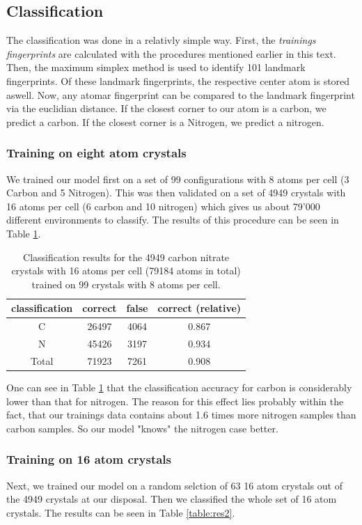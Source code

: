 \newpage
\subsection{Classification}
The classification was done in a relativly simple way. First, the \emph{trainings fingerprints} are calculated with the procedures mentioned earlier in this text. Then, the maximum simplex method is used to identify 101 landmark fingerprints. Of these landmark fingerprints, the respective center atom is stored aswell. Now, any atomar fingerprint can be compared to the landmark fingerprint via the euclidian distance. If the closest corner to our atom is a carbon, we predict a carbon. If the closest corner is a Nitrogen, we predict a nitrogen.\\
\subsubsection{Training on eight atom crystals}
We trained our model first on a set of 99 configurations with 8 atoms per cell (3 Carbon and 5 Nitrogen). This was then validated on a set of 4949 crystals with 16 atoms per cell (6 carbon and 10 nitrogen) which gives us about 79'000 different environments to classify. The results of this procedure can be seen in Table \ref{table:res1}. 

\begin{table}[h!]
\center
\begin{tabular}{c|c|c|c}
classification & correct & false & correct (relative) \\ \hline
C              & 26497   & 4064  & 0.867              \\ \hline
N              & 45426   & 3197  & 0.934              \\ \hline
Total          & 71923   & 7261  & 0.908             
\end{tabular}
\caption{Classification results for the 4949 carbon nitrate crystals with 16 atoms per cell (79184 atoms in total) trained on 99 crystals with 8 atoms per cell.}
\label{table:res1}
\end{table}

One can see in Table \ref{table:res1} that the classification accuracy for carbon is considerably lower than that for nitrogen. The reason for this effect lies probably within the fact, that our trainings data contains about 1.6 times more nitrogen samples than carbon samples. So our model "knows" the nitrogen case better.

\subsubsection{Training on 16 atom crystals}
Next, we trained our model on a random selction of 63 16 atom crystals out of the 4949 crystals at our disposal. Then we classified the whole set of 16 atom crystals. The results can be seen in Table \ref{table:res2}.

